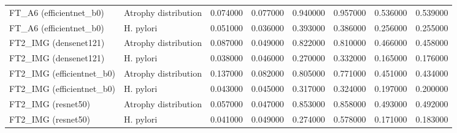 \begin{table}
\begin{tabular}{llrrrrrr}
FT\_A6 (efficientnet\_b0) & Atrophy distribution & 0.074000 & 0.077000 & 0.940000 & 0.957000 & 0.536000 & 0.539000 \\
FT\_A6 (efficientnet\_b0) & H. pylori & 0.051000 & 0.036000 & 0.393000 & 0.386000 & 0.256000 & 0.255000 \\
FT2\_IMG (densenet121) & Atrophy distribution & 0.087000 & 0.049000 & 0.822000 & 0.810000 & 0.466000 & 0.458000 \\
FT2\_IMG (densenet121) & H. pylori & 0.038000 & 0.046000 & 0.270000 & 0.332000 & 0.165000 & 0.176000 \\
FT2\_IMG (efficientnet\_b0) & Atrophy distribution & 0.137000 & 0.082000 & 0.805000 & 0.771000 & 0.451000 & 0.434000 \\
FT2\_IMG (efficientnet\_b0) & H. pylori & 0.043000 & 0.045000 & 0.317000 & 0.324000 & 0.197000 & 0.200000 \\
FT2\_IMG (resnet50) & Atrophy distribution & 0.057000 & 0.047000 & 0.853000 & 0.858000 & 0.493000 & 0.492000 \\
FT2\_IMG (resnet50) & H. pylori & 0.041000 & 0.049000 & 0.274000 & 0.578000 & 0.171000 & 0.183000 \\
\bottomrule
\end{tabular}
\end{table}
